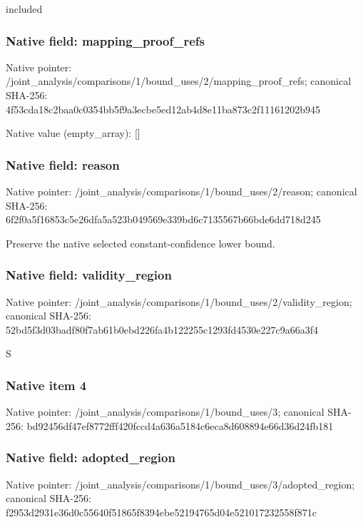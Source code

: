 \documentclass[10pt,a4paper]{article}
\begin{document}
\begingroup\raggedright\sloppy included\par\endgroup

\subsubsection{Native field: mapping\_\allowbreak{}proof\_\allowbreak{}refs}
Native pointer: /joint\_\allowbreak{}analysis/comparisons/1/bound\_\allowbreak{}uses/2/mapping\_\allowbreak{}proof\_\allowbreak{}refs; canonical SHA-256: 4f53cda18c2baa0c0354bb5f9a3ecbe5ed12ab4d8e11ba873c2f11161202b945

Native value (empty\_\allowbreak{}array): []

\subsubsection{Native field: reason}
Native pointer: /joint\_\allowbreak{}analysis/comparisons/1/bound\_\allowbreak{}uses/2/reason; canonical SHA-256: 6f2f0a5f16853c5e26dfa5a523b049569e339bd6c7135567b66bde6dd718d245

\begingroup\raggedright\sloppy Preserve the native selected constant-confidence lower bound.\par\endgroup

\subsubsection{Native field: validity\_\allowbreak{}region}
Native pointer: /joint\_\allowbreak{}analysis/comparisons/1/bound\_\allowbreak{}uses/2/validity\_\allowbreak{}region; canonical SHA-256: 52bd5f3d03badf80f7ab61b0ebd226fa4b122255c1293fd4530e227c9a66a3f4

\begingroup\raggedright\sloppy S\par\endgroup

\subsubsection{Native item 4}
Native pointer: /joint\_\allowbreak{}analysis/comparisons/1/bound\_\allowbreak{}uses/3; canonical SHA-256: bd92456df47ef8772fff420fccd4a636a5184c6eca8d608894e66d36d24fb181

\subsubsection{Native field: adopted\_\allowbreak{}region}
Native pointer: /joint\_\allowbreak{}analysis/comparisons/1/bound\_\allowbreak{}uses/3/adopted\_\allowbreak{}region; canonical SHA-256: f2953d2931e36d0c55640f51865f8394ebe52194765d04e521017232558f871c
\end{document}
